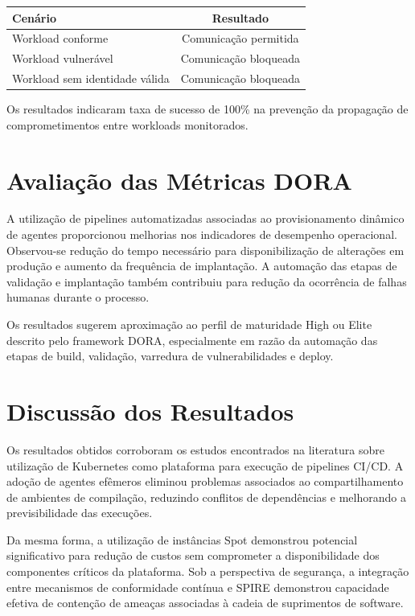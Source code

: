 \begin{table}[htbp]
\centering
{}
\label{tab:isolamento}
\begin{tabular}{|p{6cm}|c|}
\hline
\textbf{Cenário} & \textbf{Resultado} \\
\hline
Workload conforme & Comunicação permitida \\
\hline
Workload vulnerável & Comunicação bloqueada \\
\hline
Workload sem identidade válida & Comunicação bloqueada \\
\hline
\end{tabular}
\end{table}

Os resultados indicaram taxa de sucesso de 100\% na prevenção da propagação de comprometimentos entre workloads monitorados.

\section{Avaliação das Métricas DORA}
\label{sec:avaliacao-dora}

A utilização de pipelines automatizadas associadas ao provisionamento dinâmico de agentes proporcionou melhorias nos indicadores de desempenho operacional. Observou-se redução do tempo necessário para disponibilização de alterações em produção e aumento da frequência de implantação. A automação das etapas de validação e implantação também contribuiu para redução da ocorrência de falhas humanas durante o processo.

Os resultados sugerem aproximação ao perfil de maturidade High ou Elite descrito pelo framework DORA, especialmente em razão da automação das etapas de build, validação, varredura de vulnerabilidades e deploy.

\section{Discussão dos Resultados}
\label{sec:discussao-resultados}

Os resultados obtidos corroboram os estudos encontrados na literatura sobre utilização de Kubernetes como plataforma para execução de pipelines CI/CD. A adoção de agentes efêmeros eliminou problemas associados ao compartilhamento de ambientes de compilação, reduzindo conflitos de dependências e melhorando a previsibilidade das execuções.

Da mesma forma, a utilização de instâncias Spot demonstrou potencial significativo para redução de custos sem comprometer a disponibilidade dos componentes críticos da plataforma. Sob a perspectiva de segurança, a integração entre mecanismos de conformidade contínua e SPIRE demonstrou capacidade efetiva de contenção de ameaças associadas à cadeia de suprimentos de software.

